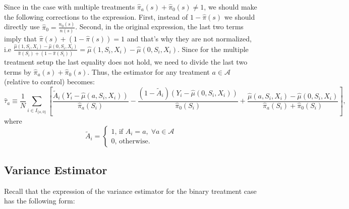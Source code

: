 \documentclass{article}
\begin{document}
Since in the case with multiple treatments $\hat{\pi}_a(s) + \hat{\pi}_0(s) \neq 1$, we should make the following corrections to the expression. First, instead of $1 - \hat{\pi}(s)$ we should directly use $\hat{\pi}_0 = \frac{n_0(s)}{n(s)}$. Second, in the original expression, the last two terms imply that $\hat{\pi}(s) + (1 - \hat{\pi}(s)) = 1$ and that's why they are not normalized, i.e $\frac{\hat{\mu}(1, S_i, X_i)- \hat{\mu}(0, S_i, X_i)}{\hat{\pi}(S_i) + (1 - \hat{\pi}(S_i))} = \hat{\mu}(1, S_i, X_i)- \hat{\mu}(0, S_i, X_i)$. Since for the multiple treatment setup the last equality does not hold, we need to divide the last two terms by $\hat{\pi}_a(s) + \hat{\pi}_0(s)$. Thus, the estimator for any treatment $a \in \mathcal A$ (relative to control) becomes:
\[\hat{\tau}_a \equiv \frac{1}{N} \sum_{i \in I_{\{a,0\}}} \left[\frac{\tilde{A}_i (Y_i - \hat{\mu}(a, S_i, X_i))}{\hat{\pi}_a(S_i)} - \frac{(1 - \tilde{A}_i) (Y_i- \hat{\mu}(0,S_i,X_i))}{\hat{\pi}_0(S_i)} + \frac{\hat{\mu}(a, S_i, X_i) - \hat{\mu}(0, S_i, X_i)}{\hat{\pi}_a(S_i) + \hat{\pi}_0(S_i) }\right],\]
where 
\[\tilde{A}_i = \begin{cases}1\text{, if }A_i = a, \; \forall a \in \mathcal{A} \\ 0\text{, otherwise.}\end{cases}\]

\subsection*{Variance Estimator}

Recall that the expression of the variance estimator for the binary treatment case has the following form:
\end{document}
